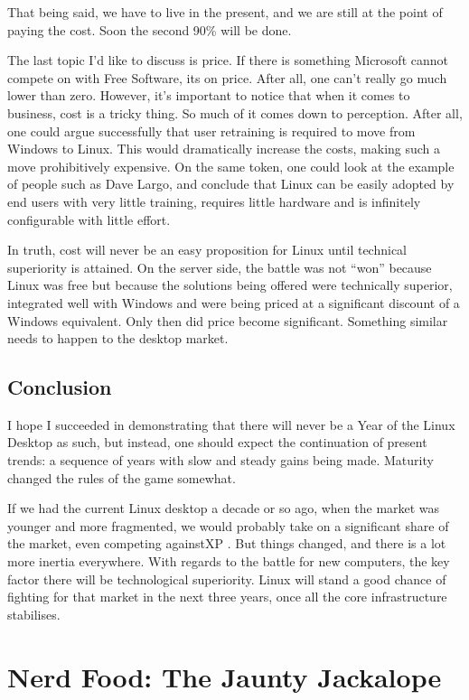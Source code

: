 \documentclass{memoir}
\begin{document}
That being said, we have to live in the present, and we are still at
the point of paying the cost. Soon the second 90\% will be done.

The last topic I'd like to discuss is price. If there is something
Microsoft cannot compete on with Free Software, its on price. After
all, one can't really go much lower than zero. However, it's important
to notice that when it comes to business, cost is a tricky thing. So
much of it comes down to perception. After all, one could argue
successfully that user retraining is required to move from Windows to
Linux. This would dramatically increase the costs, making such a move
prohibitively expensive. On the same token, one could look at the
example of people such as Dave Largo, and conclude that Linux can be
easily adopted by end users with very little training, requires little
hardware and is infinitely configurable with little effort.

In truth, cost will never be an easy proposition for Linux until
technical superiority is attained. On the server side, the battle was
not ``won'' because Linux was free but because the solutions being
offered were technically superior, integrated well with Windows and
were being priced at a significant discount of a Windows
equivalent. Only then did price become significant. Something similar
needs to happen to the desktop market.

\section{Conclusion}

I hope I succeeded in demonstrating that there will never be a Year of
the Linux Desktop as such, but instead, one should expect the
continuation of present trends: a sequence of years with slow and
steady gains being made. Maturity changed the rules of the game
somewhat.

If we had the current Linux desktop a decade or so ago, when the
market was younger and more fragmented, we would probably take on a
significant share of the market, even competing againstXP . But things
changed, and there is a lot more inertia everywhere. With regards to
the battle for new computers, the key factor there will be
technological superiority. Linux will stand a good chance of fighting
for that market in the next three years, once all the core
infrastructure stabilises.

\chapter{Nerd Food: The Jaunty Jackalope}
\end{document}
